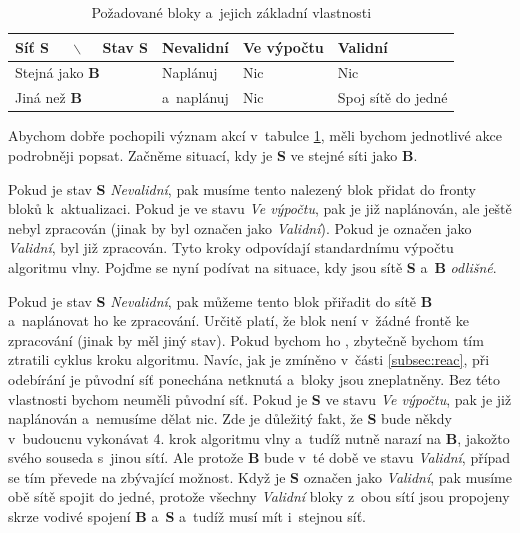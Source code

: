 \begin{table}[h]
\centering
\begin{tabular}{| l | l | l | l |}
	\hline
	Síť  \textbf{S}~~~$\backslash$~~ Stav \textbf{S}	& Nevalidní			& Ve výpočtu	& Validní 			\\ \hline
	Stejná jako \textbf{B}					& Naplánuj 	 		& Nic 			& Nic 	     			\\ \hline
	Jiná než \textbf{B} 						& \uv{Ukradni} a~naplánuj & Nic 			& Spoj sítě do jedné   	\\ \hline
\end{tabular}
\caption{Požadované bloky a~jejich základní vlastnosti}
\label{table:networkAlg}
\end{table}

\FloatBarrier

Abychom dobře pochopili význam akcí v~tabulce \ref{table:networkAlg}, měli bychom jednotlivé akce podrobněji popsat. Začněme situací, kdy je \textbf{S} ve stejné síti jako \textbf{B}.

Pokud je stav \textbf{S} \textit{Nevalidní}, pak musíme tento nalezený blok přidat do fronty bloků k~aktualizaci. Pokud je ve stavu \textit{Ve výpočtu}, pak je již naplánován, ale ještě nebyl zpracován (jinak by byl označen jako \textit{Validní}). Pokud je označen jako \textit{Validní}, byl již zpracován. Tyto kroky odpovídají standardnímu výpočtu algoritmu vlny. Pojďme se nyní podívat na situace, kdy jsou sítě \textbf{S} a~\textbf{B} \textit{odlišné}.

Pokud je stav \textbf{S} \textit{Nevalidní}, pak můžeme tento blok přiřadit do sítě \textbf{B} a~naplánovat ho ke zpracování. Určitě platí, že blok není v~žádné frontě ke zpracování (jinak by měl jiný stav). Pokud bychom ho , zbytečně bychom tím ztratili cyklus kroku algoritmu. Navíc, jak je zmíněno v~části \ref{subsec:reac}, při odebírání je původní síť ponechána netknutá a~bloky jsou zneplatněny. Bez této vlastnosti bychom neuměli  původní síť. Pokud je \textbf{S} ve stavu \textit{Ve výpočtu}, pak je již naplánován a~nemusíme dělat nic. Zde je důležitý fakt, že \textbf{S} bude někdy v~budoucnu vykonávat 4. krok algoritmu vlny a~tudíž nutně narazí na \textbf{B}, jakožto svého souseda s~jinou sítí. Ale protože \textbf{B} bude v~té době ve stavu \textit{Validní}, případ se tím převede na zbývající možnost. Když je \textbf{S} označen jako \textit{Validní}, pak musíme obě sítě spojit do jedné, protože všechny \textit{Validní} bloky z~obou sítí jsou propojeny skrze vodivé spojení \textbf{B} a~\textbf{S} a~tudíž musí mít i~stejnou síť.




